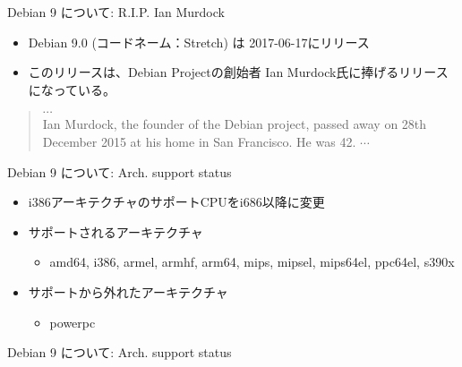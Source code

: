 \documentclass[cjk,c,squeeze,shrink,dvipdfmx,12pt]{beamer}
\begin{document}

\begin{frame}[fragile]{Debian 9 について: R.I.P. Ian Murdock}
  \begin{itemize}
  \item %
    Debian 9.0 (コードネーム：Stretch) は 2017-06-17にリリース
  \item %
    このリリースは、Debian Projectの創始者 Ian Murdock氏に捧げるリリースになっている。
  \end{itemize}
  \begin{quote}
    $\cdots$\\
    Ian Murdock, the founder of the Debian project, passed away on 28th
    December 2015 at his home in San Francisco. He was 42.
    $\cdots$\\
  \end{quote}
\end{frame}


\begin{frame}[fragile]{Debian 9 について: Arch. support status}%

\begin{itemize}
\item i386アーキテクチャのサポートCPUをi686以降に変更
\item サポートされるアーキテクチャ
  \begin{itemize}
  \item
    amd64, i386, armel, armhf, arm64, mips,
    mipsel, {\alert{mips64el}}, ppc64el, s390x
  \end{itemize}
\item サポートから外れたアーキテクチャ
  \begin{itemize}
  \item
    powerpc
  \end{itemize}
\end{itemize}
\end{frame}


\begin{frame}[fragile]{Debian 9 について: Arch. support status}%

  \centering
\end{frame}
\end{document}
